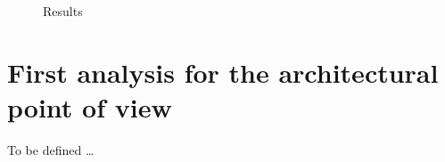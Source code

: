 \documentclass[10pt]{article}
\begin{document}
\begin{figure}[htbp]
  \caption{Results}
  \label{Fig:PositionVelocity}
\end{figure}


\section{First analysis for the architectural point of view}
\label{Sec:Analysis}

To be defined \ldots
\end{document}
